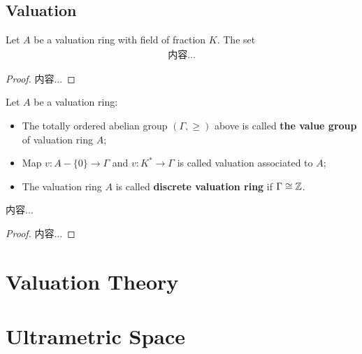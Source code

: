 \documentclass[Total.tex]{subfiles}
\begin{document}
		\section{Valuation}
			\begin{lemma}
				Let $A$ be a valuation ring with field of fraction $K$. The set
				\begin{gather*}
					内容...
				\end{gather*}
			\end{lemma}
			\begin{proof}
				内容...
			\end{proof}
			\begin{Def}
				Let $A$ be a valuation ring:
				\begin{itemize}
					\item The totally ordered abelian group $(\Gamma,\geq)$ above is called \textbf{the value group} of valuation ring $A$;
					\item Map $v:A-\{0\}\rightarrow \Gamma$ and $v:K^*\rightarrow \Gamma$ is called valuation associated to $A$;
					\item The valuation ring $A$ is called \textbf{discrete valuation ring} if $\Gamma\cong \mathbb{Z}$.
				\end{itemize}
			\end{Def}
			
			\begin{lemma}
				内容...
			\end{lemma}
			\begin{proof}
				内容...
			\end{proof}
	\chapter{Valuation Theory}
	\chapter{Ultrametric Space}
\end{document}
